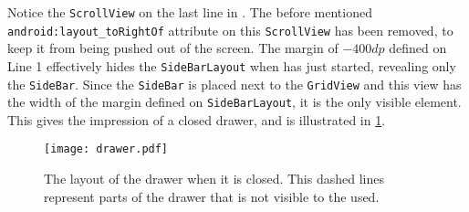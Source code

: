 Notice the \lstinline|ScrollView| on the last line in .
The before mentioned \lstinline{android:layout_toRightOf} attribute on this \lstinline|ScrollView| has been removed, to keep it from being pushed out of the screen.
The margin of $-400dp$ defined on Line 1 effectively hides the \lstinline|SideBarLayout| when \homeactivity has just started, revealing only the \lstinline|SideBar|.
Since the \lstinline|SideBar| is placed next to the \lstinline|GridView| and this view has the width of the margin defined on \lstinline|SideBarLayout|, it is the only visible element.
This gives the impression of a closed drawer, and is illustrated in \cref{fig:drawerhidden}.

\begin{figure}[h]
\centering
\texttt{[image: drawer.pdf]}
\caption{The layout of the drawer when it is closed. This dashed lines represent parts of the drawer that is not visible to the used.}
\label{fig:drawerhidden}
\end{figure}